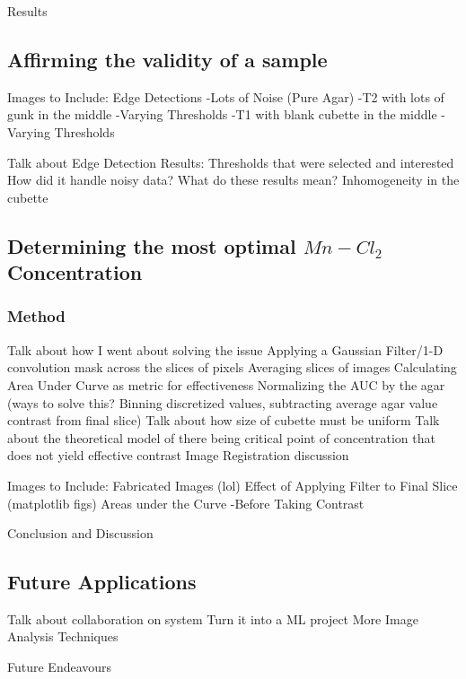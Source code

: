 \documentclass[a4paper,12pt]{article}
\begin{document}
\newpage
\begin{section}{Results}
\subsection{Affirming the validity of a sample}
Images to Include: Edge Detections
	-Lots of Noise (Pure Agar)
	-T2 with lots of gunk in the middle
		-Varying Thresholds
	-T1 with blank cubette in the middle
		-Varying Thresholds

Talk about Edge Detection Results:
	Thresholds that were selected and interested
	How did it handle noisy data?
	What do these results mean?
	Inhomogeneity in the cubette

\subsection{Determining the most optimal $Mn-Cl_2$ Concentration}
\subsubsection{Method}
Talk about how I went about solving the issue
	Applying a Gaussian Filter/1-D convolution mask across the slices of pixels
	Averaging slices of images
	Calculating Area Under Curve as metric for effectiveness
Normalizing the AUC by the agar (ways to solve this? Binning discretized values, subtracting average agar value contrast from final slice)
Talk about how size of cubette must be uniform
Talk about the theoretical model of there being critical point of concentration that does not yield effective contrast
Image Registration discussion

Images to Include: Fabricated Images (lol)
	Effect of Applying Filter to Final Slice (matplotlib figs)
	Areas under the Curve
		-Before Taking Contrast



\end{section}

\newpage
\begin{section}{Conclusion and Discussion}
\subsection{Future Applications}

Talk about collaboration on system
	Turn it into a ML project
	More Image Analysis Techniques

Future Endeavours
\end{section}
\end{document}
